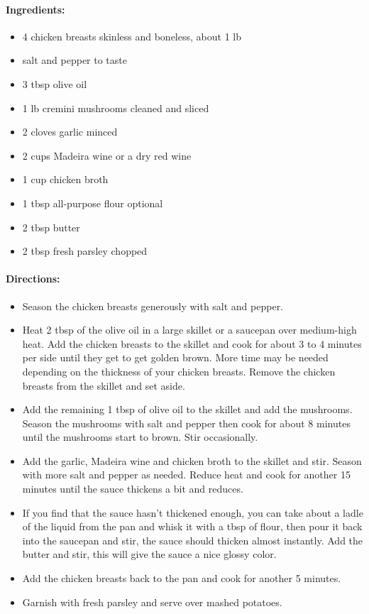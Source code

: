 \documentclass{article}
\begin{document}
\paragraph{Ingredients:}
\begin{itemize}
    \item 4 chicken breasts skinless and boneless, about 1 lb
    \item salt and pepper to taste
    \item 3 tbsp olive oil
    \item 1 lb cremini mushrooms cleaned and sliced
    \item 2 cloves garlic minced
    \item 2 cups Madeira wine or a dry red wine
    \item 1 cup chicken broth
    \item 1 tbsp all-purpose flour optional
    \item 2 tbsp butter
    \item 2 tbsp fresh parsley chopped
\end{itemize}

\paragraph{Directions:}
\begin{itemize}
    \item Season the chicken breasts generously with salt and pepper.
    \item Heat 2 tbsp of the olive oil in a large skillet or a saucepan over medium-high heat. Add the chicken breasts to the skillet and cook for about 3 to 4 minutes per side until they get to get golden brown. More time may be needed depending on the thickness of your chicken breasts. Remove the chicken breasts from the skillet and set aside.
    \item Add the remaining 1 tbsp of olive oil to the skillet and add the mushrooms. Season the mushrooms with salt and pepper then cook for about 8 minutes until the mushrooms start to brown. Stir occasionally.
    \item Add the garlic, Madeira wine and chicken broth to the skillet and stir. Season with more salt and pepper as needed. Reduce heat and cook for another 15 minutes until the sauce thickens a bit and reduces.
    \item If you find that the sauce hasn’t thickened enough, you can take about a ladle of the liquid from the pan and whisk it with a tbsp of flour, then pour it back into the saucepan and stir, the sauce should thicken almost instantly. Add the butter and stir, this will give the sauce a nice glossy color.
    \item Add the chicken breasts back to the pan and cook for another 5 minutes.
    \item Garnish with fresh parsley and serve over mashed potatoes.
\end{itemize}
\end{document}
